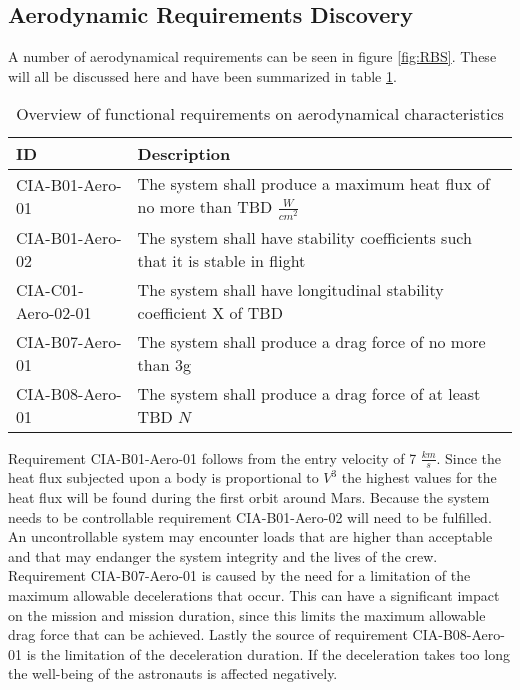 \subsection{Aerodynamic Requirements Discovery} 
\label{sec:aero}
A number of aerodynamical requirements can be seen in figure \ref{fig:RBS}. These will all be discussed here and have been summarized in table \ref{tab:aeroreqs}. 


\begin{table}[h]
	\caption{Overview of functional requirements on aerodynamical characteristics}
	\label{tab:aeroreqs}
	\begin{tabular}{|p{}|p{}|}
		\hline
		ID & Description \\
		\hline \hline
		CIA-B01-Aero-01 & The system shall produce a maximum heat flux of no more than TBD $\frac{W}{cm^{2}}$ \\ \hline
		CIA-B01-Aero-02 & The system shall have stability coefficients such that it is stable in flight \\ \hline
		CIA-C01-Aero-02-01 & The system shall have longitudinal stability coefficient X of TBD \\ \hline
		CIA-B07-Aero-01 & The system shall produce a drag force of no more than 3g \\ \hline
		CIA-B08-Aero-01 & The system shall produce a drag force of at least TBD $N$ \\ \hline
	\end{tabular}
\end{table}

Requirement CIA-B01-Aero-01 follows from the entry velocity of 7 $\frac{km}{s}$. Since the heat flux subjected upon a body is proportional to $V^{3}$ \cite{Tauber1986} the highest values for the heat flux will be found during the first orbit around Mars. 
Because the system needs to be controllable requirement CIA-B01-Aero-02 will need to be fulfilled. An uncontrollable system may encounter loads that are higher than acceptable and that may endanger the system integrity and the lives of the crew.
Requirement CIA-B07-Aero-01 is caused by the need for a limitation of the maximum allowable decelerations that occur. This can have a significant impact on the mission and mission duration, since this limits the maximum allowable drag force that can be achieved.
Lastly the source of requirement CIA-B08-Aero-01 is the limitation of the deceleration duration. If the deceleration takes too long the well-being of the astronauts is affected negatively.